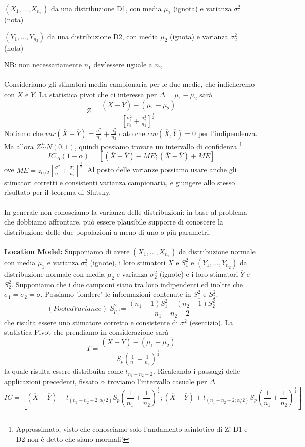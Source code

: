\noindent $(X_1,...,X_{n_1})$ da una distribuzione D1, con media $\mu_1$ (ignota) e varianza $\sigma_1^2$ (nota)

\noindent $(Y_1,...,Y_{n_2})$ da una distribuzione D2, con media $\mu_2$ (ignota) e varianza $\sigma_2^2$ (nota)

\noindent NB: non necessariamente $n_1$ dev'essere uguale a $n_2$
\\ \\
Consideriamo gli stimatori media campionaria per le due medie, che indicheremo con $\overline{X}$ e $\overline{Y}$.
La statistica pivot che ci interessa per $\Delta=\mu_1-\mu_2$ sarà $$Z=\frac{(\overline{X} - \overline{Y})-(\mu_1 - \mu_2)}{\left[ \frac{\sigma_1^2}{n_1} + \frac{\sigma_2^2}{n_2} \right]^{\frac{1}{2}}}$$
Notiamo che $var(\overline{X} - \overline{Y})=\frac{\sigma_1^2}{n_1} + \frac{\sigma_2^2}{n_2}$ dato che $cov(\overline{X} , \overline{Y})=0$ per l'indipendenza.
Ma allora $Z \stackrel{a}{\sim} N(0,1)$, quindi possiamo trovare un intervallo di confidenza \footnote{Approssimato, visto che conosciamo solo l'andamento asintotico di Z! D1 e D2 non è detto che siano mormali!}
$$IC_\Delta(1-\alpha)=[(\overline{X} - \overline{Y})-ME;(\overline{X} - \overline{Y})+ME]$$ ove $ME=z_{\alpha/2} \left[ \frac{\sigma_1^2}{n_1} + \frac{\sigma_2^2}{n_2} \right]^{\frac{1}{2}}$.
Al posto delle varianze possiamo usare anche gli stimatori corretti e consistenti varianza campionaria, e giungere allo stesso risultato per il teorema di Slutsky.
\\ \\
In generale non conosciamo la varianza delle distribuzioni: in base al problema che dobbiamo affrontare, può essere plausibile supporre di conoscere la distribuzione delle due popolazioni a meno di uno o più parametri. \\ \\ 
\textbf{Location Model:} Supponiamo di avere $(X_1,...,X_{n_1})$ da distribuzione normale con media $\mu_1$ e varianza $\sigma_1^2$ (ignote), i loro stimatori $\overline{X}$ e $S^2_1$ e
 $(Y_1,...,Y_{n_2})$ da distribuzione normale con media $\mu_2$ e varianza $\sigma_2^2$ (ignote) e i loro stimatori $\overline{Y}$ e $S^2_2$. Supponiamo che i due campioni siano tra loro indipendenti ed inoltre che $\sigma_1=\sigma_2=\sigma$.
Possiamo 'fondere' le informazioni contenute in $S^2_1$ e $S^2_2$: $$(Pooled Variance) \; S^2_p:= \frac{(n_1 - 1)S^2_1 + (n_2 - 1)S^2_2}{n_1 + n_2 - 2} $$ 
che risulta essere uno stimatore corretto e consistente di $\sigma^2$ (esercizio).
La statistica Pivot che prendiamo in considerazione sarà $$T=\frac{(\overline{X} - \overline{Y})-(\mu_1 - \mu_2)}{S_p \left(\frac{1}{n_1} + \frac{1}{n_2} \right)^{\frac{1}{2}}}$$ la quale risulta essere distribuita come $t_{n_1 + n_2 - 2}$. Ricalcando i passaggi delle applicazioni precedenti, fissato $\alpha$  troviamo l'intervallo casuale per $\Delta$ $$IC = \left[(\overline{X} - \overline{Y}) - t_{(n_1 + n_2 - 2;\alpha / 2)} S_p \left(\frac{1}{n_1} + \frac{1}{n_2} \right)^{\frac{1}{2}} ; (\overline{X} - \overline{Y}) + t_{(n_1 + n_2 - 2;\alpha / 2)} S_p \left(\frac{1}{n_1} + \frac{1}{n_2} \right)^{\frac{1}{2}} \right]$$
